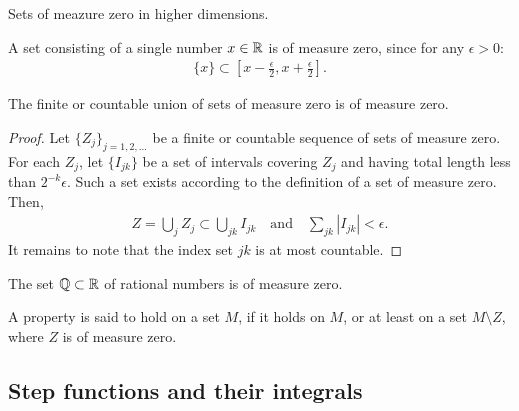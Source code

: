 \begin{todo}
  \begin{definition}
    \label{def:zero-set-2}
    Sets of meazure zero in higher dimensions.
  \end{definition}
\end{todo}

\begin{example}
  A set consisting of a single number $x\in\mathbb R$ is of measure zero,
  since for any $\epsilon>0$:
  \begin{gather*}
    \{x\} \subset \left[x-\tfrac\epsilon2,x+\tfrac\epsilon2\right].  
  \end{gather*}
\end{example}

\begin{lemma}
  The finite or countable union of sets of measure zero is of measure
  zero.
\end{lemma}

\begin{proof}
  Let $\{Z_j\}_{j=1,2,\dots}$ be a finite or countable sequence of
  sets of measure zero. For each $Z_j$, let $\{I_{jk}\}$ be a set of
  intervals covering $Z_j$ and having total length less than
  $2^{-k}\epsilon$. Such a set exists according to the definition of
  a set of measure zero. Then,
  \begin{gather*}
    Z = \bigcup_j Z_j \subset \bigcup_{jk} I_{jk}
    \quad\text{and}\quad
    \sum_{jk} |I_{jk}| < \epsilon.
  \end{gather*}
  It remains to note that the index set $jk$ is at most countable.
\end{proof}

\begin{corollary}
  The set $\mathbb Q\subset \mathbb R$ of rational numbers is of measure zero.
\end{corollary}

\begin{definition}
  \label{def:almost-everywhere}
  A property is said to hold  on a set $M$,
  if it holds on $M$, or at least on a set $M\setminus Z$, where $Z$
  is of measure zero.
\end{definition}

\subsection{Step functions and their integrals}

